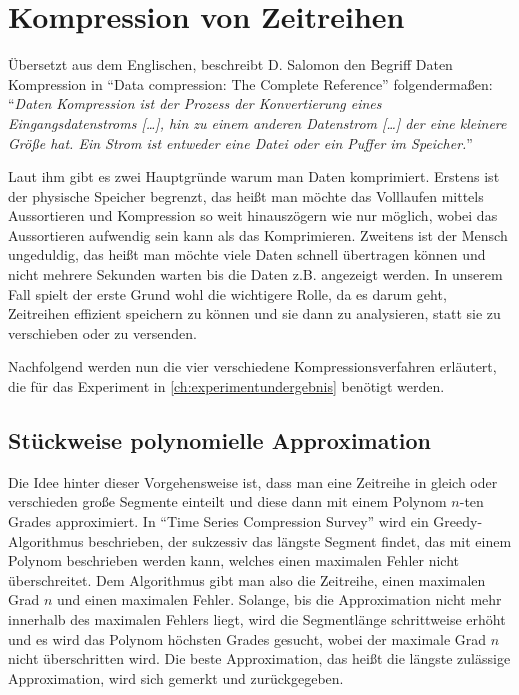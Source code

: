 \section{Kompression von Zeitreihen}
Übersetzt aus dem Englischen, beschreibt D. Salomon den Begriff Daten Kompression in "`Data compression: The Complete Reference"' \cite[p. 1-2]{d2004} folgendermaßen: "`\textit{Daten Kompression ist der Prozess der Konvertierung eines Eingangsdatenstroms [\ldots], hin zu einem anderen Datenstrom [\ldots] der eine kleinere Größe hat. Ein Strom ist entweder eine Datei oder ein Puffer im Speicher.}"'

Laut ihm gibt es zwei Hauptgründe warum man Daten komprimiert. Erstens ist der physische Speicher begrenzt, das heißt man möchte das Volllaufen mittels Aussortieren und Kompression so weit hinauszögern wie nur möglich, wobei das Aussortieren aufwendig sein kann als das Komprimieren. Zweitens ist der Mensch ungeduldig, das heißt man möchte viele Daten schnell übertragen können und nicht mehrere Sekunden warten bis die Daten z.B. angezeigt werden. In unserem Fall spielt der erste Grund wohl die wichtigere Rolle, da es darum geht, Zeitreihen effizient speichern zu können und sie dann zu analysieren, statt sie zu verschieben oder zu versenden.

Nachfolgend werden nun die vier verschiedene Kompressionsverfahren erläutert, die für das Experiment in \autoref{ch:experimentundergebnis} benötigt werden.

\subsection{Stückweise polynomielle Approximation}\label{subsec:ppa}
Die Idee hinter dieser Vorgehensweise ist, dass man eine Zeitreihe in gleich oder verschieden große Segmente einteilt und diese dann mit einem Polynom $n$-ten Grades approximiert. In "`Time Series Compression Survey"' \cite[Ch. 4.2.1]{gc2023} wird ein Greedy-Algorithmus beschrieben, der sukzessiv das längste Segment findet, das mit einem Polynom beschrieben werden kann, welches einen maximalen Fehler nicht überschreitet. Dem Algorithmus gibt man also die Zeitreihe, einen maximalen Grad $n$ und einen maximalen Fehler. Solange, bis die Approximation nicht mehr innerhalb des maximalen Fehlers liegt, wird die Segmentlänge schrittweise erhöht und es wird das Polynom höchsten Grades gesucht, wobei der maximale Grad $n$ nicht überschritten wird. Die beste Approximation, das heißt die längste zulässige Approximation, wird sich gemerkt und zurückgegeben.

